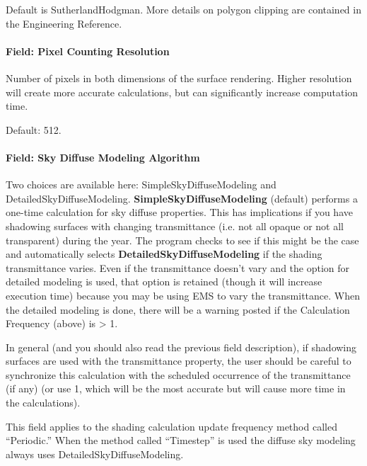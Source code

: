 Default is SutherlandHodgman. More details on polygon clipping are contained in the Engineering Reference.

\paragraph{Field: Pixel Counting Resolution}

Number of pixels in both dimensions of the surface rendering. Higher resolution will create more accurate calculations, but can significantly increase computation time.

Default: 512.

\paragraph{Field: Sky Diffuse Modeling Algorithm}\label{field-sky-diffuse-modeling-algorithm}

Two choices are available here: SimpleSkyDiffuseModeling and DetailedSkyDiffuseModeling. \textbf{SimpleSkyDiffuseModeling} (default) performs a one-time calculation for sky diffuse properties. This has implications if you have shadowing surfaces with changing transmittance (i.e. not all opaque or not all transparent) during the year. The program checks to see if this might be the case and automatically selects \textbf{DetailedSkyDiffuseModeling} if the shading transmittance varies. Even if the transmittance doesn't vary and the option for detailed modeling is used, that option is retained (though it will increase execution time) because you may be using EMS to vary the transmittance. When the detailed modeling is done, there will be a warning posted if the Calculation Frequency (above) is \textgreater{} 1.

In general (and you should also read the previous field description), if shadowing surfaces are used with the transmittance property, the user should be careful to synchronize this calculation with the scheduled occurrence of the transmittance (if any) (or use 1, which will be the most accurate but will cause more time in the calculations).

This field applies to the shading calculation update frequency method called ``Periodic.'' When the method called ``Timestep'' is used the diffuse sky modeling always uses DetailedSkyDiffuseModeling.

